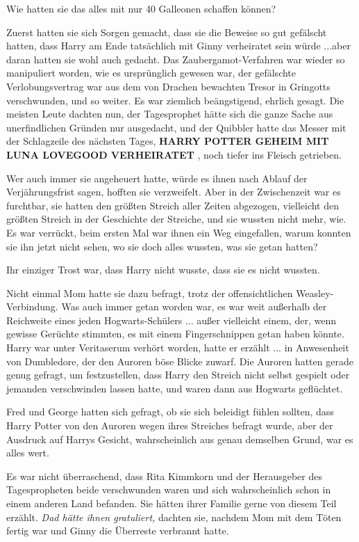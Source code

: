 Wie hatten sie das alles mit nur 40 Galleonen schaffen können?

Zuerst hatten sie sich Sorgen gemacht, dass sie die Beweise so gut gefälscht
hatten, dass Harry am Ende tatsächlich mit Ginny verheiratet sein würde ...aber
daran hatten sie wohl auch gedacht. Das Zaubergamot-Verfahren war wieder so
manipuliert worden, wie es ursprünglich gewesen war, der gefälschte
Verlobungsvertrag war aus dem von Drachen bewachten Tresor in Gringotts
verschwunden, und so weiter. Es war ziemlich beängstigend, ehrlich gesagt. Die
meisten Leute dachten nun, der Tagesprophet hätte sich die ganze Sache aus
unerfindlichen Gründen nur ausgedacht, und der Quibbler hatte das Messer mit der
Schlagzeile des nächsten Tages, \textbf{HARRY POTTER GEHEIM MIT LUNA LOVEGOOD
VERHEIRATET} , noch tiefer ins Fleisch getrieben.

Wer auch immer sie angeheuert hatte, würde es ihnen nach Ablauf der
Verjährungsfrist sagen, hofften sie verzweifelt. Aber in der Zwischenzeit war es
furchtbar, sie hatten den größten Streich aller Zeiten abgezogen, vielleicht den
größten Streich in der Geschichte der Streiche, und sie wussten nicht mehr, wie.
Es war verrückt, beim ersten Mal war ihnen ein Weg eingefallen, warum konnten
sie ihn jetzt nicht sehen, wo sie doch alles wussten, was sie getan hatten?

Ihr einziger Trost war, dass Harry nicht wusste, dass sie es nicht wussten.

Nicht einmal Mom hatte sie dazu befragt, trotz der offensichtlichen
Weasley-Verbindung. Was auch immer getan worden war, es war weit außerhalb der
Reichweite eines jeden Hogwarts-Schülers ... außer vielleicht einem, der, wenn
gewisse Gerüchte stimmten, es mit einem Fingerschnippen getan haben könnte.
Harry war unter Veritaserum verhört worden, hatte er erzählt ... in Anwesenheit
von Dumbledore, der den Auroren böse Blicke zuwarf. Die Auroren hatten gerade
genug gefragt, um festzustellen, dass Harry den Streich nicht selbst gespielt
oder jemanden verschwinden lassen hatte, und waren dann aus Hogwarts geflüchtet.

Fred und George hatten sich gefragt, ob sie sich beleidigt fühlen sollten, dass
Harry Potter von den Auroren wegen ihres Streiches befragt wurde, aber der
Ausdruck auf Harrys Gesicht, wahrscheinlich aus genau demselben Grund, war es
alles wert.

Es war nicht überraschend, dass Rita Kimmkorn und der Herausgeber des
Tagespropheten beide verschwunden waren und sich wahrscheinlich schon in einem
anderen Land befanden. Sie hätten ihrer Familie gerne von diesem Teil erzählt.
\emph{Dad hätte ihnen gratuliert,} dachten sie, nachdem Mom mit dem Töten fertig
war und Ginny die Überreste verbrannt hatte.

